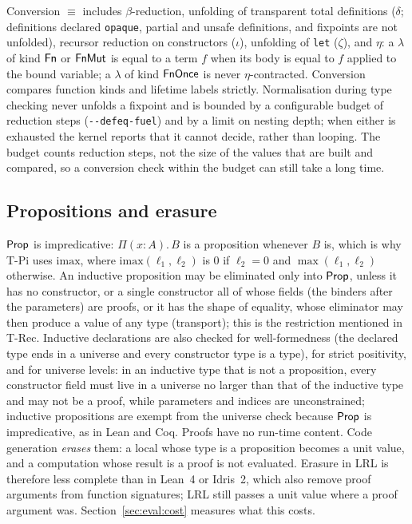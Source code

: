 Conversion $\equiv$ includes $\beta$-reduction, unfolding of transparent total definitions ($\delta$; definitions declared \lstinline|opaque|, partial and unsafe definitions, and fixpoints are not unfolded), recursor reduction on constructors ($\iota$), unfolding of \lstinline|let| ($\zeta$), and $\eta$: a $\lambda$ of kind $\mathsf{Fn}$ or $\mathsf{FnMut}$ is equal to a term $f$ when its body is equal to $f$ applied to the bound variable; a $\lambda$ of kind $\mathsf{FnOnce}$ is never $\eta$-contracted.
Conversion compares function kinds and lifetime labels strictly.
Normalisation during type checking never unfolds a fixpoint and is bounded by a configurable budget of reduction steps (\texttt{-{}-defeq-fuel}) and by a limit on nesting depth; when either is exhausted the kernel reports that it cannot decide, rather than looping. The budget counts reduction steps, not the size of the values that are built and compared, so a conversion check within the budget can still take a long time.

\subsection{Propositions and erasure}\label{sec:core:prop}

$\mathsf{Prop}$ is impredicative: $\Pi(x{:}A).\,B$ is a proposition whenever $B$ is, which is why T-Pi uses $\mathrm{imax}$, where $\mathrm{imax}(\ell_1,\ell_2)$ is $0$ if $\ell_2 = 0$ and $\max(\ell_1,\ell_2)$ otherwise.
An inductive proposition may be eliminated only into $\mathsf{Prop}$, unless it has no constructor, or a single constructor all of whose fields (the binders after the parameters) are proofs, or it has the shape of equality, whose eliminator may then produce a value of any type (transport); this is the restriction mentioned in T-Rec.
Inductive declarations are also checked for well-formedness (the declared type ends in a universe and every constructor type is a type), for strict positivity, and for universe levels: in an inductive type that is not a proposition, every constructor field must live in a universe no larger than that of the inductive type and may not be a proof, while parameters and indices are unconstrained; inductive propositions are exempt from the universe check because $\mathsf{Prop}$ is impredicative, as in Lean and Coq.
Proofs have no run-time content.
Code generation \emph{erases} them: a local whose type is a proposition becomes a unit value, and a computation whose result is a proof is not evaluated.
Erasure in LRL is therefore less complete than in Lean~4 or Idris~2, which also remove proof arguments from function signatures; LRL still passes a unit value where a proof argument was.
Section~\ref{sec:eval:cost} measures what this costs.

